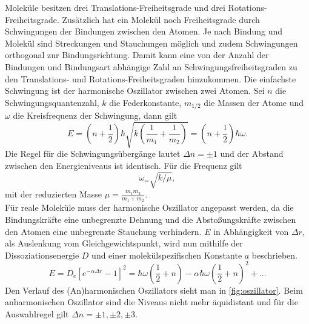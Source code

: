 \documentclass[.../bericht]{subfilies}
\begin{document}
    Moleküle besitzen drei Translations-Freiheitsgrade und drei Rotations-Freiheitsgrade. Zusätzlich hat ein Molekül noch Freiheitsgrade durch Schwingungen der Bindungen zwischen den Atomen. Je nach Bindung und Molekül sind Streckungen und Stauchungen möglich und zudem Schwingungen orthogonal zur Bindungsrichtung. Damit kann eine von der Anzahl der Bindungen und Bindungsart abhängige Zahl an Schwingungsfreiheitsgraden zu den Translations- und Rotations-Freiheitsgraden hinzukommen. Die einfachste Schwingung ist der harmonische Oszillator zwischen zwei Atomen. Sei $n$ die Schwingungsquantenzahl, $k$ die Federkonstante, $m_{1/2}$ die Massen der Atome und $\omega$ die Kreisfrequenz der Schwingung, dann gilt
    \begin{equation}
      E=(n+\frac{1}{2})\hbar \sqrt{k(\frac{1}{m_1}+\frac{1}{m_2})}=(n+\frac{1}{2})\hbar \omega.
      \label{eq:harmonischeroszi}
    \end{equation}
    Die Regel für die Schwingungsübergänge lautet $\Delta n= \pm 1$ und der Abstand zwischen den Energieniveaus ist identisch. Für die Frequenz gilt
    \begin{equation}
      \omega_=\sqrt{k/\mu},
      \label{eq:omega}
    \end{equation}
    mit der reduzierten Masse $\mu=\frac{m_1m_2}{m_1+m_2}$.\\
    Für reale Moleküle muss der harmonische Oszillator angepasst werden, da die Bindungskräfte eine unbegrenzte Dehnung und die Abstoßungskräfte zwischen den Atomen eine unbegrenzte Stauchung verhindern. $E$ in Abhängigkeit von $\Delta r$, als Auslenkung vom Gleichgewichtspunkt, wird nun mithilfe der Dissoziationsenergie $D$ und einer molekülspezifischen Konstante $a$ beschrieben.
    \begin{equation}
      E=D_e[e^{-\alpha \Delta r}-1]^2=\hbar \omega(\frac{1}{2}+n)-\alpha \hbar \omega (\frac{1}{2}+n)^2+...
      \label{eq:anharmonischerosz}
    \end{equation}
    Den Verlauf des (An)harmonischen Oszillators sieht man in \cref{fig:oszillator}.
    Beim anharmonischen Oszillator sind die Niveaus nicht mehr äquidistant und für die Auswahlregel gilt $\Delta n= \pm 1, \pm 2, \pm 3$.\\
    \cite{schwingungsspek}
\end{document}

